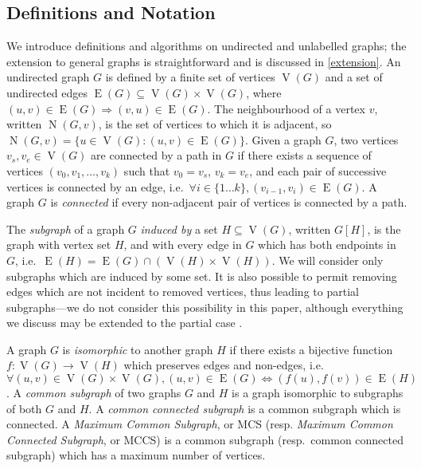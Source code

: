 \documentclass{llncs}
\begin{document}
\subsection{Definitions and Notation}

We introduce definitions and algorithms on undirected and unlabelled graphs; the
extension to general graphs is straightforward and is discussed in \cref{extension}. An undirected
graph $G$ is defined by a finite set of vertices $\operatorname{V}(G)$ and a set of undirected edges
$\operatorname{E}(G) \subseteq \operatorname{V}(G) \times \operatorname{V}(G)$, where $(u, v) \in
\operatorname{E}(G) \Rightarrow (v, u) \in \operatorname{E}(G)$. The neighbourhood of
a vertex $v$, written $\operatorname{N}(G, v)$, is the set of vertices to which it is adjacent, so
$\operatorname{N}(G, v) = \{ u \in \operatorname{V}(G) : (u, v) \in \operatorname{E}(G) \}$.
Given a graph $G$, two vertices $v_s, v_e \in \operatorname{V}(G)$ are connected by a path in $G$ if
there exists a sequence of vertices $(v_0, v_1, \ldots, v_k)$ such that $v_0 = v_s$, $v_k = v_e$,
and each pair of successive vertices is connected by an edge, i.e.\ $\forall i\in \{1 \ldots k \},
(v_{i-1}, v_i) \in \operatorname{E}(G)$. A graph $G$ is \emph{connected} if every non-adjacent pair
of vertices is connected by a path.

The \emph{subgraph} of a graph $G$ \emph{induced by} a set $H \subseteq \operatorname{V}(G)$,
written $G[H]$, is the graph with vertex set $H$, and with every edge in $G$ which has both
endpoints in $G$, i.e.\ $\operatorname{E}(H) = \operatorname{E}(G) \cap (\operatorname{V}(H) \times
\operatorname{V}(H))$. We will consider only subgraphs which are induced by some set. It is also
possible to permit removing edges which are not incident to removed vertices, thus leading to
partial subgraphs---we do not consider this possibility in this paper, although everything we
discuss may be extended to the partial case \cite{DBLP:conf/mco/VismaraV08,DBLP:conf/cp/NdiayeS11}.

A graph $G$ is \emph{isomorphic} to another graph $H$ if there exists a bijective function $f :
\operatorname{V}(G) \rightarrow \operatorname{V}(H)$ which preserves edges and non-edges, i.e.\
$\forall (u, v) \in \operatorname{V}(G) \times \operatorname{V}(G), (u, v) \in \operatorname{E}(G)
\Leftrightarrow (f(u),f(v)) \in \operatorname{E}(H)$.  A \emph{common subgraph} of two graphs $G$
and $H$ is a graph isomorphic to subgraphs of both $G$ and $H$. A \emph{common connected subgraph} is a
common subgraph which is connected.  A \emph{Maximum Common Subgraph}, or MCS (resp. \emph{Maximum
Common Connected Subgraph}, or MCCS) is a common subgraph (resp.\ common connected subgraph) which has
a maximum number of vertices.
\end{document}
